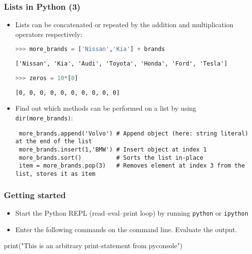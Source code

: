   \begin{frame}[fragile]
    \frametitle{Lists in Python (3)}
    \begin{itemize}
      \item Lists can be concatenated or repeated by the addition and multiplication operators respectively: 
      \begin{lstlisting}[language=Python,numbers=none]
  >>> more_brands = ['Nissan','Kia'] + brands
      \end{lstlisting}
      \begin{lstlisting}[style=PyOutput]
  ['Nissan', 'Kia', 'Audi', 'Toyota', 'Honda', 'Ford', 'Tesla']
      \end{lstlisting}
      \begin{lstlisting}[language=Python,numbers=none]
  >>> zeros = 10*[0]
      \end{lstlisting}
      \begin{lstlisting}[style=PyOutput]
  [0, 0, 0, 0, 0, 0, 0, 0, 0, 0]
      \end{lstlisting}
      \item Find out which methods can be performed on a list by using \lstinline|dir(more_brands)|:
      \begin{lstlisting}
 more_brands.append('Volvo') # Append object (here: string literal) at the end of the list 
 more_brands.insert(1,'BMW') # Insert object at index 1
 more_brands.sort()          # Sorts the list in-place
 item = more_brands.pop(3)   # Removes element at index 3 from the list, stores it as item
 \end{lstlisting}
    \end{itemize}
   \end{frame}


 \begin{frame}[fragile]
  \frametitle{Getting started}
   \begin{itemize}
    \item Start the Python REPL (read–eval–print loop) by running \lstinline|python| or \lstinline|ipython|
    \item Enter the following commands on the command line. Evaluate the output.
   \end{itemize}
   \pause
\begin{pyblock}
print("This is an arbitrary print-statement from pyconsole")
\end{pyblock}
\end{frame}


